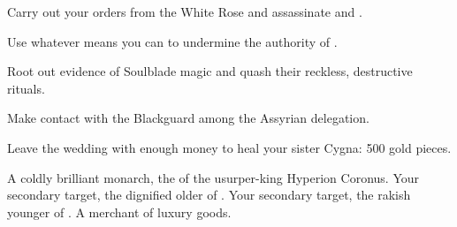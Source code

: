 \documentclass[char]{Kos}
\begin{document}
\begin{itemz}[Goals]
\item Carry out your orders from the White Rose and assassinate \cGroom{} and \cPoet{}.
\item Use whatever means you can to undermine the authority of \cEtruriaKing{\Monarch} \cEtruriaKing{}.
\item Root out evidence of Soulblade magic and quash their reckless, destructive rituals.
\item Make contact with the Blackguard among the Assyrian delegation.
\item Leave the wedding with enough money to heal your sister Cygna: 500 gold pieces.
\end{itemz}

\begin{contacts}
\contact{\cEtruriaKing{}} A coldly brilliant monarch, the \cEtruriaKing{\offspring} of the usurper-king Hyperion Coronus.
\contact{\cGroom{}} Your secondary target, the dignified older \cGroom{\offspring} of  \cEtruriaKing{\Monarch} \cEtruriaKing{}.
\contact{\cPoet{}} Your secondary target, the rakish younger \cPoet{\offspring} of  \cEtruriaKing{\Monarch} \cEtruriaKing{}.
\contact{\cMerchant{}} A merchant of luxury goods.
\end{contacts}
\end{document}
